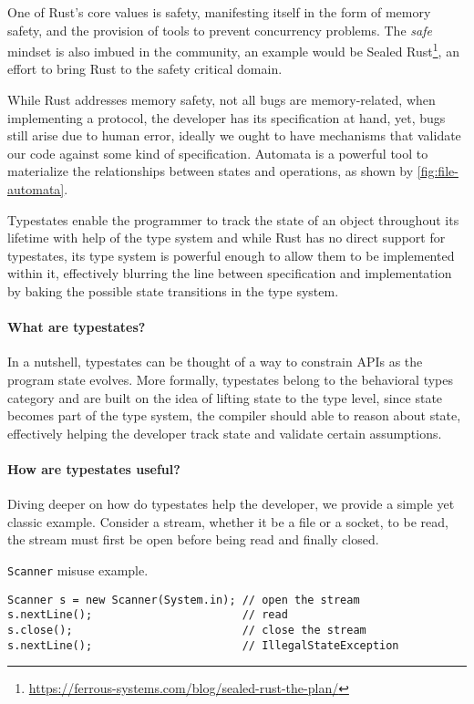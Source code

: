 \documentclass[a4paper, 10pt]{article}
\newenvironment{code}{\captionsetup{type=listing}}{}
\begin{document}
One of Rust's core values is safety,
manifesting itself in the form of memory safety,
and the provision of tools to prevent concurrency problems.
The \emph{safe} mindset is also imbued in the community,
an example would be Sealed Rust\footnote{\url{https://ferrous-systems.com/blog/sealed-rust-the-plan/}},
an effort to bring Rust to the safety critical domain.

While Rust addresses memory safety, not all bugs are memory-related,
when implementing a protocol, the developer has its specification at hand, yet, bugs still arise due to human error,
ideally we ought to have mechanisms that validate our code against some kind of specification.
Automata is a powerful tool to materialize the relationships between states and operations,
as shown by \autoref{fig:file-automata}.

Typestates enable the programmer to track the state of an object throughout its lifetime with help of the type system
and while Rust has no direct support for typestates,
its type system is powerful enough to allow them to be implemented within it,
effectively blurring the line between specification and implementation by baking the possible state transitions in the type system.



\paragraph{What are typestates?}

In a nutshell, typestates can be thought of a way to constrain APIs as the program state evolves.
More formally, typestates belong to the behavioral types category and are built on the idea of lifting state to the type level,
since state becomes part of the type system, the compiler should able to reason about state,
effectively helping the developer track state and validate certain assumptions.

\paragraph{How are typestates useful?}

Diving deeper on how do typestates help the developer, we provide a simple yet classic example.
Consider a stream, whether it be a file or a socket, to be read, the stream must first be open before being read and finally closed.

\begin{code}
    \caption{\texttt{Scanner} misuse example.}
    \label{lst:scanner-misuse}
    \begin{verbatim}
Scanner s = new Scanner(System.in); // open the stream
s.nextLine();                       // read
s.close();                          // close the stream
s.nextLine();                       // IllegalStateException
    \end{verbatim}
\end{code}
\end{document}
